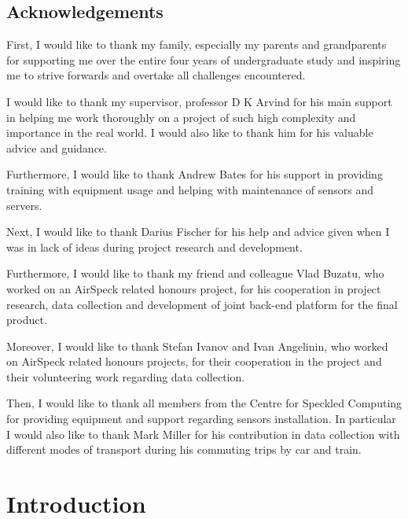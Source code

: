 \documentclass[bsc,frontabs,twoside,singlespacing, parskip,deptreport]{infthesis}     %
\begin{document}
\maketitle

\section*{Acknowledgements}

First, I would like to thank my family, especially my parents and grandparents for supporting me over the entire four years of undergraduate study and inspiring me to strive forwards and overtake all challenges encountered.

I would like to thank my supervisor, professor D K Arvind for his main support in helping me work thoroughly on a project of such high complexity and importance in the real world. I would also like to thank him for his valuable advice and guidance.

Furthermore, I would like to thank Andrew Bates for his support in providing training with equipment usage and helping with maintenance of sensors and servers.

Next, I would like to thank Darius Fischer for his help and advice given when I was in lack of ideas during project research and development.

Furthermore, I would like to thank my friend and colleague Vlad Buzatu, who worked on an AirSpeck related honours project, for his cooperation in project research, data collection and development of joint back-end platform for the final product.

Moreover, I would like to thank Stefan Ivanov and Ivan Angelinin, who worked on AirSpeck related honours projects, for their cooperation in the project and their volunteering work regarding data collection.

Then, I would like to thank all members from the Centre for Speckled Computing for providing equipment and support regarding sensors installation. In particular I would also like to thank Mark Miller for his contribution in data collection with different modes of transport during his commuting trips by car and train.


\tableofcontents



\chapter{Introduction}
\end{document}

